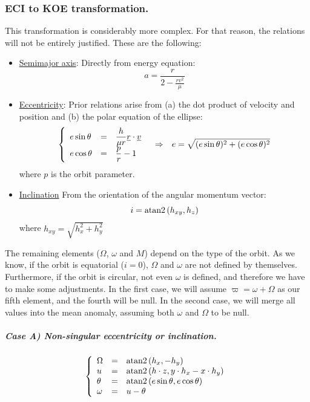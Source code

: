 		\subsubsection{ECI to KOE transformation.}
		\indent This transformation is considerably more complex. For that reason, the relations will not be entirely justified. These are the following:
		\begin{itemize}
		\item \underline{Semimajor axis}: Directly from energy equation:
		\[
		a = \dfrac{r}{2 - \frac{r v^2}{\mu}}
		\]
		\item \underline{Eccentricity}: Prior relations arise from (a) the dot product of velocity and position and (b) the polar equation of the ellipse:
		\[
		\begin{array}{ccc}
		\left\{ \begin{array}{lll}
		e\sin\theta & = & \dfrac{h}{\mu r} \underline{r} \cdot \underline{v}\\
		e\cos\theta & = & \dfrac{p}{r} - 1
		\end{array}\right. 
		&
		\Rightarrow
		& 
		e = \displaystyle\sqrt{(e\sin\theta)^2 + (e\cos\theta)^2}
		\end{array}
		\]
		\noindent where $p$ is the orbit parameter.
		\item \underline{Inclination} From the orientation of the angular momentum vector:
		\[
		i = \text{atan2}\left( h_{xy}, h_z \right)
		\]
		\noindent where $h_{xy} = \sqrt{h_x^2 + h_y^2}$
		\end{itemize}
		\indent The remaining elements ($\Omega$, $\omega$ and $M$) depend on the type of the orbit. As we know, if the orbit is equatorial ($i=0$), $\Omega$ and $\omega$ are not defined by themselves. Furthermore, if the orbit is circular, not even $\omega$ is defined, and therefore we have to make some adjustments. In the first case, we will assume $\varpi = \omega + \Omega $ as our fifth element, and the fourth will be null. In the second case, we will merge all values into the mean anomaly, assuming both $\omega$ and $\Omega$ to be null.\\
		\subparagraph{Case A) Non-singular eccentricity or inclination.\\}
		\[
		\left\{
		\begin{array}{lll}
		\Omega 	& = & \text{atan2}\left( h_x, -h_y\right)\\
		u 		& = & \text{atan2}\left( h \cdot z, y\cdot h_x - x \cdot h_y\right)\\
		\theta 	& = & \text{atan2}\left(e\sin\theta, e\cos\theta\right)\\
		\omega 	& = & u - \theta
		\end{array}\right.
		\]
